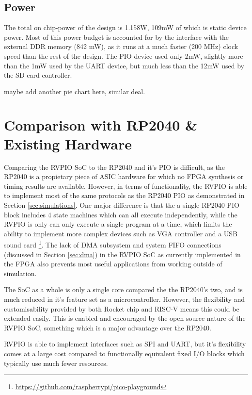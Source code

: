 \subsection{Power}

The total on chip-power of the design is 1.158W, 109mW of which is static device power. Most of this power budget is accounted for by the interface with the external DDR memory (842 mW), as it runs at a much faster (200 MHz) clock speed than the rest of the design. The PIO device used only 2mW, slightly more than the 1mW used by the UART device, but much less than the 12mW used by the SD card controller.

maybe add another pie chart here, similar deal.

\section{Comparison with RP2040 \& Existing Hardware}

Comparing the RVPIO SoC to the RP2040 and it's PIO is difficult, as the RP2040 is a propietary piece of ASIC hardware for which no FPGA synthesis or timing results are available. However, in terms of functionality, the RVPIO is able to implement most of the same protocols as the RP2040 PIO as demonstrated in Section \ref{sec:simulations}. One major difference is that the a single RP2040 PIO block includes 4 state machines which can all execute independently, while the RVPIO is only can only execute a single program at a time, which limits the ability to implement more complex devices such as VGA controller and a USB sound card \footnote{\url{https://github.com/raspberrypi/pico-playground}}. The lack of DMA subsystem and system FIFO connections (discussed in Section \ref{sec:dma}) in the RVPIO SoC as currently implemented in the FPGA also prevents most useful applications from working outside of simulation.

The SoC as a whole is only a single core compared the the RP2040's two, and is much reduced in it's feature set as a microcontroller. However, the flexibility and customisability provided by both Rocket chip and RISC-V means this could be extended easily. This is enabled and encouraged by the open source nature of the RVPIO SoC, something which is a major advantage over the RP2040.

RVPIO is able to implement interfaces such as SPI and UART, but it's flexibility comes at a large cost compared to functionally equivalent fixed I/O blocks which typically use much fewer resources.

